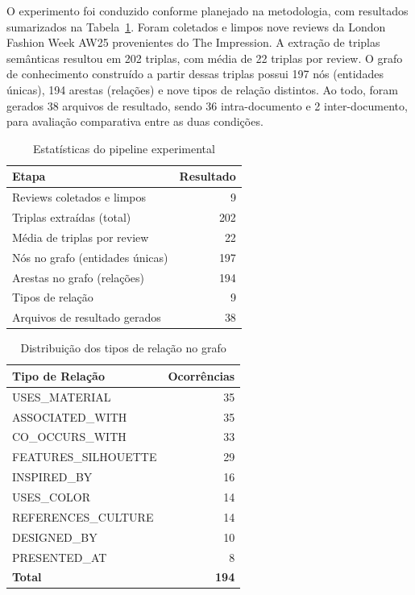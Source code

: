 \documentclass[sigconf]{acmart}
\begin{document}
O experimento foi conduzido conforme planejado na metodologia, com resultados sumarizados na Tabela~\ref{tab:pipeline}. Foram coletados e limpos nove reviews da London Fashion Week AW25 provenientes do The Impression. A extração de triplas semânticas resultou em 202 triplas, com média de 22 triplas por review. O grafo de conhecimento construído a partir dessas triplas possui 197 nós (entidades únicas), 194 arestas (relações) e nove tipos de relação distintos. Ao todo, foram gerados 38 arquivos de resultado, sendo 36 intra-documento e 2 inter-documento, para avaliação comparativa entre as duas condições.

\begin{table}[h]
\caption{Estatísticas do pipeline experimental}
\label{tab:pipeline}
\begin{tabular}{lr}
\hline
\textbf{Etapa} & \textbf{Resultado} \\
\hline
Reviews coletados e limpos & 9 \\
Triplas extraídas (total) & 202 \\
Média de triplas por review & 22 \\
Nós no grafo (entidades únicas) & 197 \\
Arestas no grafo (relações) & 194 \\
Tipos de relação & 9 \\
Arquivos de resultado gerados & 38 \\
\hline
\end{tabular}
\end{table}

\begin{table}[h]
\caption{Distribuição dos tipos de relação no grafo}
\label{tab:relacoes}
\begin{tabular}{lr}
\hline
\textbf{Tipo de Relação} & \textbf{Ocorrências} \\
\hline
USES\_MATERIAL & 35 \\
ASSOCIATED\_WITH & 35 \\
CO\_OCCURS\_WITH & 33 \\
FEATURES\_SILHOUETTE & 29 \\
INSPIRED\_BY & 16 \\
USES\_COLOR & 14 \\
REFERENCES\_CULTURE & 14 \\
DESIGNED\_BY & 10 \\
PRESENTED\_AT & 8 \\
\hline
\textbf{Total} & \textbf{194} \\
\hline
\end{tabular}
\end{table}
\end{document}
